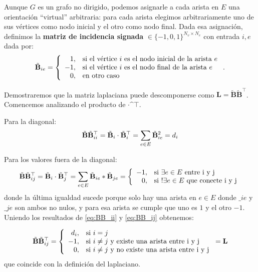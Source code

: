 \documentclass{article}
\begin{document}
Aunque $G$ es un grafo no dirigido, podemos asignarle a cada arista en $E$ una orientación ``virtual'' arbitraria: para cada arista elegimos arbitrariamente uno de sus vértices como nodo inicial y el otro como nodo final. Dada esa asignación, definimos la \textbf{matriz de incidencia signada} $\bm \in \{-1,0,1\}^{N_v\times N_e}$ con entrada $i,e$ dada por:
\begin{equation}
    \tilde{\mathbf{B}}_{ie} = \left\lbrace
    \begin{array}{r l}
        1,  & \text{si el vértice } i \text{ es el nodo inicial de la arista } e \\
        -1, & \text{si el vértice } i \text{ es el nodo final de la arista } e   \\
        0,  & \text{en otro caso}
    \end{array}
    \right. .
    \label{eq:matrix_incidencia}
\end{equation}

Demostraremos que la matriz laplaciana puede descomponerse como $\mathbf{L}=\tilde{\mathbf{B}}\tilde{\mathbf{B}}^\top$. Comencemos analizando el producto de $\bm\cdot\bm^\top$.

Para la diagonal:
\begin{equation}
    \label{eq:BB_ii}
    \tilde{\mathbf{B}}\tilde{\mathbf{B}}^\top_{ii} = \tilde{\mathbf{B}}_i \cdot \tilde{\mathbf{B}}_i^\top = \sum_{e\in E} \tilde{\mathbf{B}}_{ie}^2 = d_i
\end{equation}

Para los valores fuera de la diagonal:
\begin{equation}
    \label{eq:BB_ij}
    \tilde{\mathbf{B}}\tilde{\mathbf{B}}^\top_{ij} = \tilde{\mathbf{B}}_i\cdot\tilde{\mathbf{B}}_j^\top = \sum_{e\in E} \tilde{\mathbf{B}}_{ie} * \tilde{\mathbf{B}}_{je} = \left\lbrace
    \begin{array}{r l}
        -1, & \text{si $\exists e\in E$ entre i y j}         \\
        0,  & \text{si $!\exists e \in E$ que conecte i y j}
    \end{array}
    \right.
\end{equation}
donde la última igualdad sucede porque solo hay una arista en $e \in E$ donde
$\bm_{ie}$ y $\bm_{je}$ son ambos no nulos, y para esa arista se cumple que uno es
$1$ y el otro $-1$. Uniendo los resultados de \eqref{eq:BB_ii} y \eqref{eq:BB_ij} obtenemos:

\begin{equation}
    \label{eq:L_igual_BB}
    \tilde{\mathbf{B}}\tilde{\mathbf{B}}^\top_{ij} = \left\lbrace
    \begin{array}{r l}
        d_i, & \text{si $i=j$}                                        \\
        -1,  & \text{si $i\neq j$ y existe una arista entre i y j}    \\
        0,   & \text{si $i\neq j$ y no existe una arista entre i y j}
    \end{array}
    \right. = \mathbf{L}
\end{equation}
que coincide con la definición del laplaciano.
\end{document}
